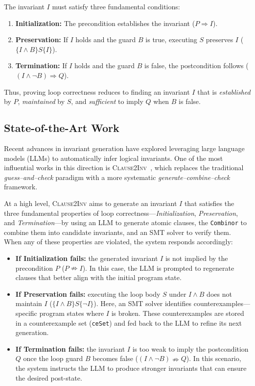 \documentclass[letterpaper]{article} %
\begin{document}
\noindent
The invariant $I$ must satisfy three fundamental conditions:
\begin{enumerate}
    \item \textbf{Initialization:} The precondition establishes the invariant ($P \Rightarrow I$).  
    \item \textbf{Preservation:} If $I$ holds and the guard $B$ is true, executing $S$ preserves $I$ ($\{ I \wedge B \} S \{ I \}$).  
    \item \textbf{Termination:} If $I$ holds and the guard $B$ is false, the postcondition follows ($(I \wedge \lnot B) \Rightarrow Q$).  
\end{enumerate}

\noindent
Thus, proving loop correctness reduces to finding an invariant $I$ that is 
\textit{established} by $P$, \textit{maintained} by $S$, and \textit{sufficient} to imply $Q$ when $B$ is false.

\subsection{State-of-the-Art Work}

Recent advances in invariant generation have explored leveraging large language models (LLMs) to automatically infer logical invariants. One of the most influential works in this direction is \textsc{Clause2Inv}~\cite{cao2025clause2inv}, which replaces the traditional \textit{guess–and–check} paradigm with a more systematic \textit{generate–combine–check} framework.

At a high level, \textsc{Clause2Inv} aims to generate an invariant $I$ that satisfies the three fundamental properties of loop correctness—\textit{Initialization}, \textit{Preservation}, and \textit{Termination}—by using an LLM to generate atomic clauses, the \texttt{Combinor} to combine them into candidate invariants, and an SMT solver to verify them. When any of these properties are violated, the system responds accordingly:

\begin{itemize}
    \item \textbf{If Initialization fails:} the generated invariant $I$ is not implied by the precondition $P$ ($P \nRightarrow I$).  
    In this case, the LLM is prompted to regenerate clauses that better align with the initial program state.

    \item \textbf{If Preservation fails:} executing the loop body $S$ under $I \wedge B$ does not maintain $I$ ($\{I \wedge B\} S \{\lnot I\}$).  
    Here, an SMT solver identifies counterexamples—specific program states where $I$ is broken.  
    These counterexamples are stored in a counterexample set (\texttt{ceSet}) and fed back to the LLM to refine its next generation.

    \item \textbf{If Termination fails:} the invariant $I$ is too weak to imply the postcondition $Q$ once the loop guard $B$ becomes false ($(I \wedge \lnot B) \nRightarrow Q$).  
    In this scenario, the system instructs the LLM to produce stronger invariants that can ensure the desired post-state.
\end{itemize}
\end{document}
